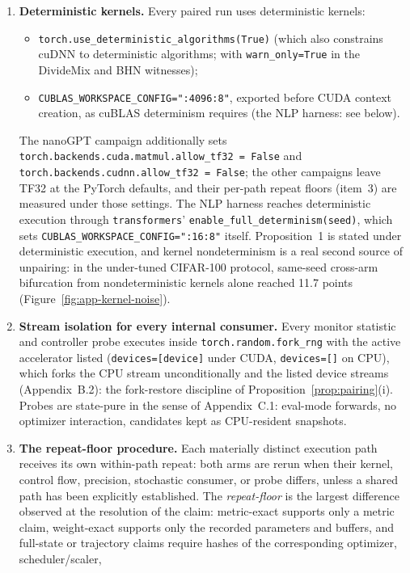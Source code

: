 \documentclass[10pt,letterpaper]{article}
\theoremstyle{remark}
\newcommand{\code}[1]{\texttt{#1}}
\begin{document}
\begin{enumerate}\itemsep2pt
\item \textbf{Deterministic kernels.} Every paired run uses deterministic kernels:
\begin{itemize}\itemsep1pt
\item \code{torch.use\_deterministic\_algorithms(True)} (which also
constrains cuDNN to deterministic algorithms; with \code{warn\_only=True} in
the DivideMix and BHN witnesses);
\item \code{CUBLAS\_WORKSPACE\_CONFIG=":4096:8"}, exported before CUDA
context creation, as cuBLAS determinism requires (the NLP harness: see
below).
\end{itemize}
The nanoGPT campaign additionally sets
\code{torch.backends.cuda.matmul.allow\_tf32 = False} and
\code{torch.backends.cudnn.allow\_tf32 = False}; the other campaigns leave
TF32 at the PyTorch defaults, and their per-path repeat floors (item~3) are
measured under those settings.
The NLP harness reaches deterministic execution through \code{transformers}'
\code{enable\_full\_determinism(seed)}, which sets
\code{CUBLAS\_WORKSPACE\_CONFIG=":16:8"} itself. Proposition~1 is stated under
deterministic execution, and kernel nondeterminism is a real second source
of unpairing: in the under-tuned
CIFAR-100 protocol, same-seed cross-arm bifurcation from nondeterministic
kernels alone reached 11.7 points (Figure~\ref{fig:app-kernel-noise}).
\item \textbf{Stream isolation for every internal consumer.} Every monitor
statistic and controller probe executes inside \code{torch.random.fork\_rng}
with the active accelerator listed (\code{devices=[device]} under CUDA,
\code{devices=[]} on CPU), which forks
the CPU stream unconditionally and the listed device streams (Appendix~B.2):
the fork-restore discipline of Proposition~\ref{prop:pairing}(i). Probes are
state-pure in the sense of Appendix~C.1: eval-mode forwards, no optimizer
interaction, candidates kept as CPU-resident snapshots.
\item \textbf{The repeat-floor procedure.} Each materially distinct execution
path receives its own within-path repeat: both arms are rerun when their
kernel, control flow, precision, stochastic consumer, or probe differs,
unless a shared path has been explicitly established. The
\emph{repeat-floor} is the largest difference observed at the resolution of
the claim: metric-exact supports only a metric claim, weight-exact supports
only the recorded parameters and buffers, and full-state or trajectory
claims require hashes of the corresponding optimizer, scheduler/scaler,

\end{enumerate}
\end{document}
